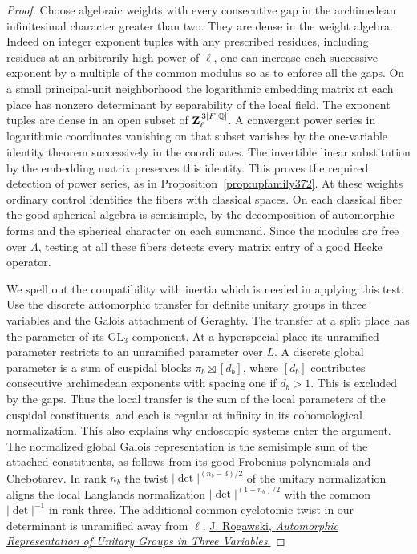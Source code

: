 \documentclass[a4paper,11pt]{article}
\theoremstyle{definition}
\theoremstyle{remark}
\numberwithin{equation}{section}
\begin{document}
\begin{proof}
Choose algebraic weights with every consecutive gap in the
archimedean infinitesimal character greater than two. They
are dense in the weight algebra. Indeed on integer exponent
tuples with any prescribed residues, including residues at
an arbitrarily high power of \(\ell\), one can increase each
successive exponent by a multiple of the common modulus so
as to enforce all the gaps. On a small principal-unit
neighborhood the logarithmic embedding matrix at each place
has nonzero determinant by separability of the local field.
The exponent tuples are dense in an open subset of
\(\mathbf Z_\ell^{\,3[F:\mathbb Q]}\). A convergent power series
in logarithmic coordinates vanishing on that subset vanishes
by the one-variable identity theorem successively in the
coordinates. The invertible linear substitution by the
embedding matrix preserves this identity. This proves the
required detection of power series, as in
Proposition~\ref{prop:upfamily372}. At these weights ordinary
control identifies the fibers with classical spaces. On each
classical fiber the good spherical algebra is semisimple,
by the decomposition of automorphic forms and the spherical
character on each summand. Since the modules are free over
\(\Lambda\), testing at all these fibers detects every matrix
entry of a good Hecke operator.

We spell out the compatibility with inertia which is needed
in applying this test. Use the discrete automorphic transfer
for definite unitary groups in three variables and the
Galois attachment of Geraghty. The transfer at a split place
has the parameter of its \(\mathrm{GL}_3\) component. At a
hyperspecial place its unramified parameter restricts to an
unramified parameter over \(L\). A discrete global parameter
is a sum of cuspidal blocks \(\pi_b\boxtimes[d_b]\), where
\([d_b]\) contributes consecutive archimedean exponents
with spacing one if \(d_b>1\). This is excluded by the gaps.
Thus the local transfer is the sum of the local parameters
of the cuspidal constituents, and each is regular at infinity
in its cohomological normalization. This also explains why
endoscopic systems enter the argument. The normalized global
Galois representation is the semisimple sum of the attached
constituents, as follows from its good Frobenius polynomials
and Chebotarev. In rank \(n_b\) the twist
\(|\det|^{(n_b-3)/2}\) of the unitary normalization aligns
the local Langlands normalization \(|\det|^{(1-n_b)/2}\)
with the common \(|\det|^{-1}\) in rank three. The additional
common cyclotomic twist in our determinant is unramified
away from \(\ell\).
\cite{VIII-VI-geraghty363}
\href{https://press.princeton.edu/books/ebook/9781400882441/automorphic-representation-of-unitary-groups-in-three-variables-pdf}{J. Rogawski,
\emph{Automorphic Representation of Unitary Groups in Three Variables}.}


\end{proof}
\end{document}
